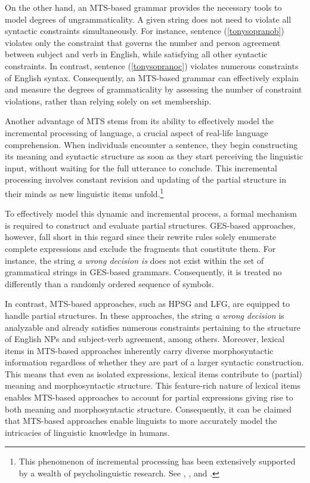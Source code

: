 On the other hand, an MTS-based grammar provides the necessary tools to model degrees of ungrammaticality. A given string does not need to violate all syntactic constraints simultaneously. For instance, sentence (\ref{tonysopranob}) violates only the constraint that governs the number and person agreement between subject and verb in English, while satisfying all other syntactic constraints. In contrast, sentence (\ref{tonysopranoc}) violates numerous constraints of English syntax. Consequently, an MTS-based grammar can effectively explain and measure the degrees of grammaticality by assessing the number of constraint violations, rather than relying solely on set membership.

Another advantage of MTS stems from its ability to effectively model the incremental processing of language, a crucial aspect of real-life language comprehension.  When individuals encounter a sentence, they begin constructing its meaning and syntactic structure as soon as they start perceiving the linguistic input, without waiting for the full utterance to conclude. This incremental processing involves constant revision and updating of the partial structure in their minds as new linguistic items unfold.\footnote{This phenomenon of incremental processing has been extensively supported by a wealth of psycholinguistic research. See \citet{Levelt1993}, \citet{Tanenhaus1995}, and \citet{VONDERMALSBURG2011}.} 

To effectively model this dynamic and incremental process, a formal mechanism is required to construct and evaluate partial structures. GES-based approaches, however, fall short in this regard since their rewrite rules solely enumerate complete expressions and exclude the fragments that constitute them. For instance, the string \textit{a wrong decision is} does not exist within the set of grammatical strings in GES-based grammars. Consequently, it is treated no differently than a randomly ordered sequence of symbols. 

In contrast, MTS-based approaches, such as HPSG and LFG, are equipped to handle partial structures. In these approaches, the string \textit{a wrong decision} is analyzable and already satisfies numerous constraints pertaining to the structure of English NPs and subject-verb agreement, among others. Moreover, lexical items in MTS-based approaches inherently carry diverse morphosyntactic information regardless of whether they are part of a larger syntactic construction. This means that even as isolated expressions, lexical items contribute to (partial) meaning and morphosyntactic structure. This feature-rich nature of lexical items enables MTS-based approaches to account for partial expressions giving rise to both meaning and morphosyntactic structure. Consequently, it can be claimed that MTS-based approaches enable linguists to more accurately model the intricacies of linguistic knowledge in humans.

